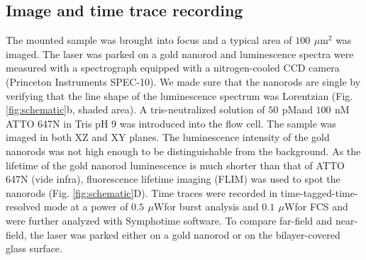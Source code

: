 \documentclass[journal=jpccck,manuscript=article]{achemso}
\newcommand{\uW}{\ensuremath{\,\mu\textrm{W}}}
\newcommand{\um}{\ensuremath{\,\mu\textrm{m}}}
\newcommand{\nM}{\ensuremath{\,\textrm{nM}}}
\newcommand{\pM}{\ensuremath{\,\textrm{pM}}}
\begin{document}
\subsection{Image and time trace recording}
The mounted sample was brought into focus and a typical area of $100~\um^2$ was imaged. The laser was parked on a 
gold nanorod and luminescence spectra were measured with a spectrograph equipped with a nitrogen-cooled CCD 
camera (Princeton Instruments SPEC-10). We made sure that the nanorods are single by verifying that the line shape 
of the luminescence spectrum was Lorentzian (Fig. \ref{fig:schematic}b, shaded area). A tris-neutralized 
solution of $50~$\pM and $100~$\nM ATTO 647N in Tris pH 9 was introduced into the flow cell. The sample was imaged 
in both XZ and XY planes. The luminescence intensity of the gold nanorods was not high enough to be distinguishable
from the background. As the lifetime of the gold nanorod luminescence is much shorter than that of 
ATTO 647N (vide infra), fluorescence lifetime imaging (FLIM) was used to spot the 
nanorods (Fig. \ref{fig:schematic}D). Time traces were recorded in time-tagged-time-resolved mode at a power 
of $0.5~$\uW for burst analysis and $0.1~$\uW for FCS and were further analyzed with Symphotime software. 
To compare far-field and near-field, the laser was parked either on a gold nanorod or on the 
bilayer-covered glass surface.
\end{document}
